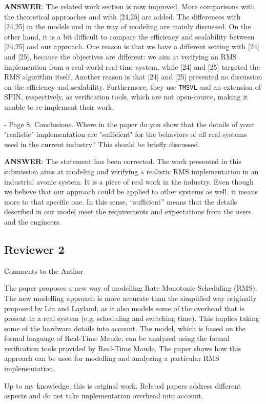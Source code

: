 \documentclass[10pt,journal]{IEEEtran}
\newcommand{\ANSWER}{{\bf ANSWER}}
\begin{document}
\ANSWER: The related work section is now improved. More comparisons
with the theoretical approaches and with [24,25] are added. The
differences with [24,25] in the models and in the way of modeling are
mainly discussed. On the other hand, it is a bit difficult to compare
the efficiency and scalability between [24,25] and our approach. One
reason is that we have a different setting with [24] and [25], because
the objectives are different: we aim at verifying an RMS implemention
from a real-world real-time system, while [24] and [25] targeted the
RMS algorithm itself. Another reason is that [24] and [25] presented
no discussion on the efficiency and scalability. Furthermore, they use
\verb|TMSVL| and an extension of SPIN, respectively, as verification
tools, which are not open-source, making it unable to re-implement
their work.

- Page 8, Conclusions. Where in the paper do you show that the details
of your "realistic" implementation are "sufficient" for the behaviors
of all real systems used in the current industry? This should be
briefly discussed.

\ANSWER: The statement has been corrected. The work presented in this
submission aims at modeling and verifying a realistic RMS
implementation in an industrial avonic system. It is a piece of real
work in the industry. Even though we believe that our approach could
be applied to other systems as well, it means more to that specific
one. In this sense, ``sufficient'' means that the details described in
our model meet the requirements and expectations from the users and
the engineers.


\subsection{Reviewer 2}
Comments to the Author

The paper proposes a new way of modelling Rate Monotonic Scheduling
(RMS).  The new modelling approach is more accurate than the
simplified way originally proposed by Liu and Layland, as it also
models some of the overhead that is present in a real system
(e.g. scheduling and switching time).  This implies taking some of the
hardware details into account.  The model, which is based on the
formal language of Real-Time Maude, can be analyzed using the formal
verification tools provided by Real-Time Maude.  The paper shows how
this approach can be used for modelling and analyzing a particular RMS
implementation.

Up to my knowledge, this is original work. Related papers address
different aspects and do not take implementation overhead into
account.
\end{document}
